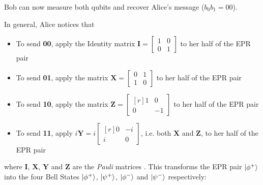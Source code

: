\documentclass[11pt, oneside]{article}   	%
\begin{document}
\bigskip
\noindent
Bob can now measure both qubits and recover Alice's message ($b_0b_1 = 00$). 


\bigskip
\noindent
In general, Alice notices that 

\begin{itemize}
\item To send \textbf{00}, apply the Identity matrix $\mathbf{I} = \begin{bmatrix} 1 & 0 \\ 0 & 1 \end{bmatrix}$ to her half of the EPR pair
\item To send \textbf{01}, apply the matrix $\mathbf{X} = \begin{bmatrix} 0 & 1 \\ 1 & 0 \end{bmatrix}$ to her half of the EPR pair
\item To send \textbf{10}, apply the matrix $\mathbf{Z} = \begin{bmatrix}[r] 1 & 0 \\ 0 & -1 \end{bmatrix}$ to her half of the EPR pair
\item To send \textbf{11}, apply $i\mathbf{Y} = i \begin{bmatrix}[r] 0 & -i \\ i & 0 \end{bmatrix}$, i.e. both $\mathbf{X}$ and $\mathbf{Z}$,  to her half of the EPR pair
\end{itemize} 

\bigskip
\noindent
where $\mathbf{I}$, $\mathbf{X}$, $\mathbf{Y}$ and $\mathbf{Z}$ are the \emph{Pauli} matrices \cite{wiki:pauli_matrices}. 
\bigskip
\noindent
This transforms the EPR pair $\ket{\phi^+}$ into the four Bell States $\ket{\phi^+}$, $\ket{\psi^+}$, $\ket{\phi^-}$ and $\ket{\psi^-}$ respectively:
\end{document}
